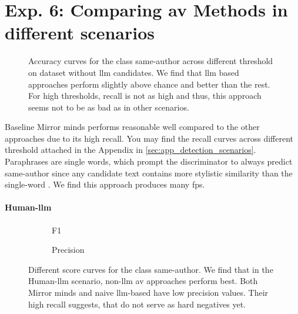 \section{Exp. 6: Comparing \ac{av} Methods in different scenarios}

\begin{figure}[htbp]
\centering
    
  \caption{Accuracy curves for the class same-author across different threshold on \dataStudent{} dataset without \ac{llm} candidates. We find that \ac{llm} based approaches perform slightly above chance and better than the rest. For high thresholds, recall is not as high and thus, this approach seems not to be as bad as in other scenarios. 
  }
  \label{fig:human-human_acc}
\end{figure}

Baseline Mirror minds performs reasonable well compared to the other approaches due to its high recall.
You may find the recall curves across different threshold attached in the Appendix in \autoref{sec:app_detection_scenarios}.
Paraphrases are single words, which prompt the discriminator to always predict same-author since any candidate text contains more stylistic similarity than the single-word \imps{}.
We find this approach produces many \acp{fp}.


\paragraph{Human-\ac{llm}}
\begin{figure}[htbp]
  \centering
  \begin{subfigure}[b]{0.48\textwidth}
    \centering
    
    \caption{F1}
    \label{fig:human-lllm_f1}
  \end{subfigure}
  \hfill
  \begin{subfigure}[b]{0.48\textwidth}
    \centering
    
    \caption{Precision}
    \label{fig:student_essays_same_author}
  \end{subfigure}
  \caption{Different score curves for the class same-author. 
  We find that in the Human-\ac{llm} scenario, non-\ac{llm} \ac{av} approaches perform best. 
  Both Mirror minds and naive \ac{llm}-based have low precision values.
  Their high recall suggests, that \imps{} do not serve as hard negatives yet.}
  \label{fig:detec_scen_human-llm}
\end{figure}